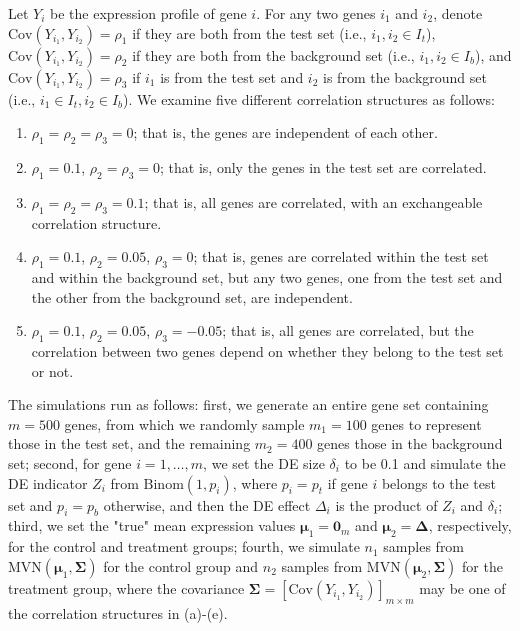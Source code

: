 \documentclass[useAMS,usenatbib, galley]{biom}
\newcommand{\aaCase}{a}
\newcommand{\aCase}{b}
\newcommand{\cCase}{c}
\newcommand{\eCase}{d}
\newcommand{\fCase}{e}
\begin{document}
	Let $Y_{i}$ be the expression profile of gene $i$. For any two genes $i_1$ and $i_2$, denote  $\text{Cov}(Y_{i_1}, Y_{i_2})=\rho_1$ if they are both from the test set (i.e., $i_1, i_2 \in I_t$),  $\text{Cov}(Y_{i_1}, Y_{i_2}) =\rho_2$ if they are both from the background set (i.e.,  $ i_1, i_2\in I_b$), and  $\text{Cov}(Y_{i_1}, Y_{i_2})= \rho_3$ if $i_1$ is from the test set and $i_2$ is from the background set (i.e., $i_1\in I_t, i_2\in I_b$). We examine five different correlation structures as follows:
	
		\begin{enumerate}
			\item[(\aaCase):] $\rho_1 = \rho_2 = \rho_3 = 0$; that is, the genes are independent of each other.
			\item[(\aCase):] $\rho_1 = 0.1$, $\rho_2 = \rho_3 = 0$; that is, only the genes in the test set are correlated.
			\item[(\cCase):] $\rho_1 = \rho_2 = \rho_3 = 0.1$; that is, all genes are correlated, with an exchangeable correlation structure. 
			\item[(\eCase):] $\rho_1 = 0.1$, $\rho_2 = 0.05$, $\rho_3 = 0$; that is, 
			 genes are correlated within the test set and within the background set, but any two genes, one from the test set and the other from the background set, are independent.
			\item[(\fCase):] $\rho_1 = 0.1$, $\rho_2 = 0.05$, $\rho_3 = -0.05$; that is, all genes are correlated, but the correlation between two genes depend on whether they belong to the test set or not.
		\end{enumerate}
		
	The simulations run as follows: first, we generate an entire gene set containing $m=500$ genes, from which we randomly sample $m_1 = 100$ genes to represent those in the test set, and the remaining $m_2=400$ genes those in the background set; second, for gene $i=1, \ldots, m$, we set the DE size $\delta_i$ to be 0.1 and simulate the DE indicator $Z_i$ from $\text{Binom}(1, p_i)$,  where $p_i= p_t$ if gene $i$ belongs to the test set and $p_i = p_b$  otherwise, and then the DE effect $\Delta_i$ is the product of $Z_i$ and $\delta_i$; third, we set the "true" mean expression values $\bm \mu_1 = \bm 0_m$ and $\bm \mu_2 = \bm \Delta$, respectively,  for the control and treatment groups; fourth, we simulate $n_1$ samples from $\text{MVN}(\bm \mu_1, \bm \Sigma)$ for the control group and $n_2$ samples from $\text{MVN}(\bm \mu_2, \bm \Sigma)$ for the treatment group, where the covariance $\bm \Sigma = \left[\text{Cov}(Y_{i_1}, Y_{i_2})\right]_{m\times m}$ may be one of the correlation structures in (\aaCase)-(\fCase).
	
\end{document}
